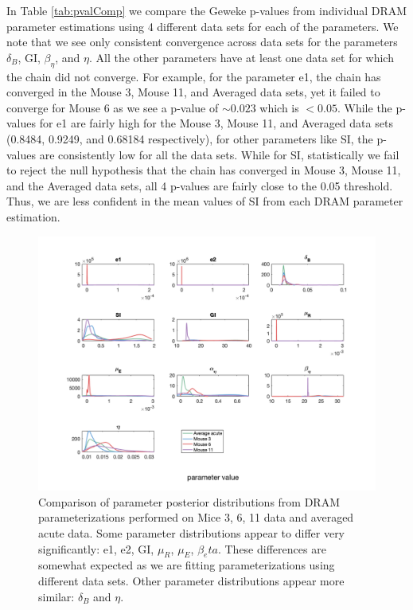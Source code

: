 In Table \ref{tab:pvalComp} we compare the Geweke p-values from individual DRAM parameter estimations using 4 different data sets for each of the parameters. We note that we see only consistent convergence across data sets for the parameters $\delta_B$, GI, $\beta_\eta$, and $\eta$. All the other parameters have at least one data set for which the chain did not converge. For example, for the parameter e1, the chain has converged in the Mouse 3, Mouse 11, and Averaged data sets, yet it failed to converge for Mouse 6 as we see a p-value of $\sim 0.023$ which is $< 0.05$. While the p-values for e1 are fairly high for the Mouse 3, Mouse 11, and Averaged data sets (0.8484, 0.9249, and 0.68184 respectively), for other parameters like SI, the p-values are consistently low for all the data sets. While for SI, statistically we fail to reject the null hypothesis that the chain has converged in Mouse 3, Mouse 11, and the Averaged data sets, all 4 p-values are fairly close to the 0.05 threshold. Thus, we are less confident in the mean values of SI from each DRAM parameter estimation.
\begin{figure}[H]
    \centering
    \includegraphics[width=18cm]{MCMC_figs/dram_t1d_final/PDFs_3_6_11_avg.png}
    \caption{Comparison of parameter posterior distributions from DRAM parameterizations performed on Mice 3, 6, 11 data and averaged acute data. Some parameter distributions appear to differ very significantly: e1, e2, GI, $\mu_R$, $\mu_E$, $\beta_eta$. These differences are somewhat expected as we are fitting parameterizations using different data sets. Other parameter distributions appear more similar: $\delta_B$ and $\eta$.}
    \label{fig:overlaiddist_t1d}
\end{figure}
